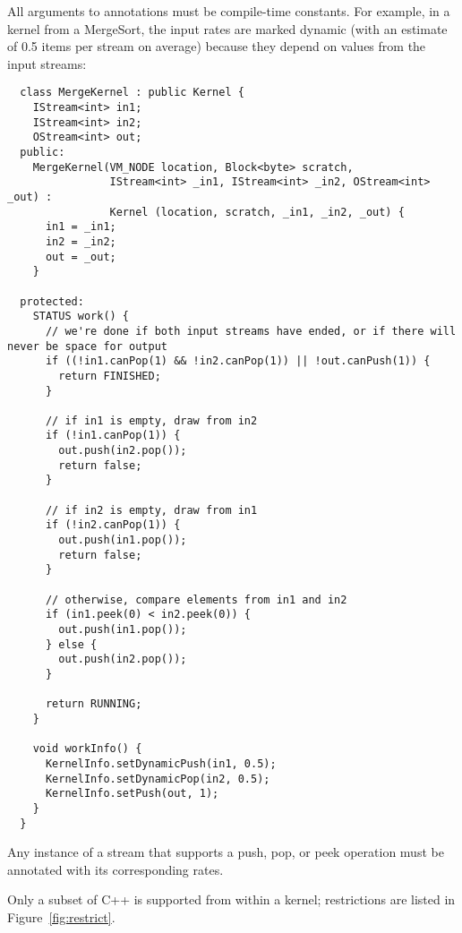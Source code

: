 All arguments to annotations must be compile-time constants.  For
example, in a kernel from a MergeSort, the input rates are marked
dynamic (with an estimate of 0.5 items per stream on average) because
they depend on values from the input streams:
{\small
\begin{verbatim}
  class MergeKernel : public Kernel {
    IStream<int> in1;
    IStream<int> in2;
    OStream<int> out;
  public:
    MergeKernel(VM_NODE location, Block<byte> scratch,
                IStream<int> _in1, IStream<int> _in2, OStream<int> _out) :
                Kernel (location, scratch, _in1, _in2, _out) {
      in1 = _in1;
      in2 = _in2;
      out = _out;
    }

  protected:
    STATUS work() {
      // we're done if both input streams have ended, or if there will never be space for output
      if ((!in1.canPop(1) && !in2.canPop(1)) || !out.canPush(1)) {
        return FINISHED;
      }

      // if in1 is empty, draw from in2
      if (!in1.canPop(1)) {          
        out.push(in2.pop());
        return false;
      }

      // if in2 is empty, draw from in1
      if (!in2.canPop(1)) {
        out.push(in1.pop());
        return false;
      } 

      // otherwise, compare elements from in1 and in2
      if (in1.peek(0) < in2.peek(0)) {
        out.push(in1.pop());
      } else {
        out.push(in2.pop());
      }

      return RUNNING;
    }

    void workInfo() {
      KernelInfo.setDynamicPush(in1, 0.5);
      KernelInfo.setDynamicPop(in2, 0.5);
      KernelInfo.setPush(out, 1);
    }
  }  
\end{verbatim}}

Any instance of a stream that supports a push, pop, or peek operation
must be annotated with its corresponding rates.


Only a subset of C++ is supported from within a kernel; restrictions
are listed in Figure~\ref{fig:restrict}.  

